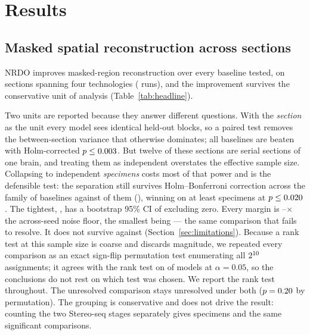 \section{Results}
\label{sec:results}

\subsection{Masked spatial reconstruction across \MSSections{} sections}





NRDO improves masked-region reconstruction over every baseline tested, on
\MSSections{} sections spanning four technologies (\MSRuns{} runs), and the
improvement survives the conservative unit of analysis
(Table~\ref{tab:headline}).

Two units are reported because they answer different questions. With the
\emph{section} as the unit every model sees identical held-out blocks, so a
paired test removes the between-section variance that otherwise dominates; all
\MSNBaselines{} baselines are beaten with Holm-corrected $p \le 0.003$.
But twelve of these sections are serial sections of one brain, and treating them
as independent overstates the effective sample size. Collapsing to
\MSSpecimens{} independent \emph{specimens} costs most of that power and is the
defensible test: the separation still survives Holm--Bonferroni correction across the
family of \MSNBaselines{} baselines against \MSSpecNSig{} of them (\MSSpecSigModels{}), winning on at least
\MSSpecSigMinWins{} specimens at $p \le 0.020$. The tightest, \MSSpecTightModel{}, has a bootstrap 95\% CI of \MSSpecTightCI{}
excluding zero. Every margin is \SeedRatioLo--\SeedRatioHi$\times$ the
across-seed noise floor, the smallest being \SeedRatioLoModel{} --- the same
comparison that fails to resolve. It does not survive against \MSSpecGraphWorstModel{}
(Section~\ref{sec:limitations}). Because a rank test at this sample size is coarse
and discards magnitude, we repeated every comparison as an exact sign-flip
permutation test enumerating all $2^{10{}}$ assignments; it agrees with
the rank test on \PermNAgree{} of \PermNModels{} models at $\alpha = 0.05$, so
the conclusions do not rest on which test was chosen. We report the rank test
throughout. The unresolved comparison stays unresolved under both
($p = 0.20$ by permutation). The grouping is conservative and does not drive
the result: counting the two Stereo-seq stages separately gives \MSSpecAltN{}
specimens and the same \MSSpecAltNSig{} significant comparisons.

